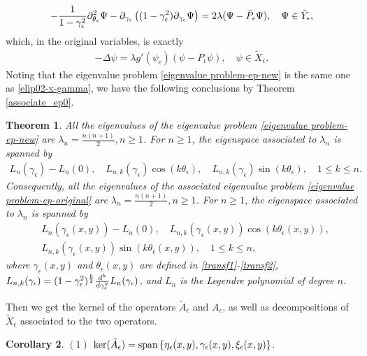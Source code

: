\documentclass[1 [leqno, 11pt]{amsart}
\numberwithin{equation}{section}
\let\ep=\epsilon
\let\pa=\partial
\newtheorem{Theorem}{Theorem}[section]
\newtheorem{Corollary}[Theorem]{Corollary}
\begin{document}
\begin{CJK*}{GBK}{song}
\begin{align}\label{eigenvalue problem-ep-new}
-{1\over1-\gamma_\ep^2}\pa_{\theta_\ep}^2\Psi-\pa_{\gamma_\ep}\left((1-\gamma_\ep^2)\pa_{\gamma_\ep}\Psi\right)
=2\lambda(\Psi-\tilde P_\ep\Psi), \quad \Psi \in \tilde{Y}_\ep,
\end{align}
which, in the original variables, is exactly
\begin{align}\label{eigenvalue problem-ep-original}
-\Delta \psi = \lambda g'(\psi_\ep)(\psi -  P_\ep\psi), \quad \psi \in \tilde{X}_\ep.
\end{align}
Noting that  the eigenvalue problem \eqref{eigenvalue problem-ep-new} is the same one as
\eqref{elip02-x-gamma}, we have the following conclusions by Theorem \ref{associate_ep0}.

\begin{Theorem}\label{associate_ep-new-variable-original-variable}
All the eigenvalues of the eigenvalue problem \eqref{eigenvalue problem-ep-new} are $\lambda_n  = \frac{n(n+1)}{2}, n\geq1$. For $n\geq1$, the eigenspace associated to $\lambda_n$ is  spanned by
\begin{align*}
 L_{n}(\gamma_\ep) - L_n(0), \quad  L_{n,k}(\gamma_\ep)\cos(k\theta_\ep), \quad L_{n,k}(\gamma_\ep)\sin(k\theta_\ep), \quad  1 \leq k\leq n.
 \end{align*}
Consequently, all the eigenvalues of the associated eigenvalue problem \eqref{eigenvalue problem-ep-original} are $\lambda_n  = \frac{n(n+1)}{2}, n\geq1$. For $n\geq1$, the eigenspace associated to $\lambda_n$ is  spanned by
\begin{align*}
& L_{n}(\gamma_\ep(x,y)) - L_n(0), \quad  L_{n,k}(\gamma_\ep(x,y))\cos(k\theta_\ep(x,y)), \\
 & L_{n,k}(\gamma_\ep(x,y))\sin(k\theta_\ep(x,y)), \quad  1 \leq k\leq n,
 \end{align*}
where $\gamma_\ep(x,y)$ and $\theta_\ep(x,y)$ are defined in \eqref{transf1}-\eqref{transf2},  $L_{n,k}(\gamma_\ep)=(1-\gamma_\ep^2)^{k\over2}{d^k\over d\gamma_\ep^k}L_n(\gamma_\ep)$, and $L_n$ is the Legendre polynomial of degree $n$.
\end{Theorem}
Then we get the kernel of  the operators $\tilde A_\ep$ and $A_\ep$, as well as  decompositions of $\tilde X_{\ep}$ associated to the two operators.

\begin{Corollary}\label{kernel of  the operator tilde A-ep and a decomposition of tilde Xep}
$(1)$ $\ker (\tilde A_\ep)={\rm{span}}\left\{\eta_\ep(x,y), \gamma_\ep(x,y), \xi_\ep(x,y)\right\}$.


\end{Corollary}
\end{CJK*}
\end{document}

